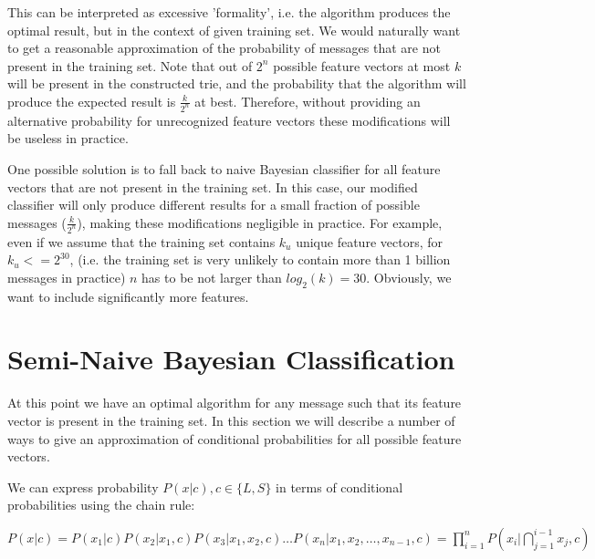 \documentclass[12pt]{report}
\makeatletter
\renewcommand{\subsection}{\@startsection{subsection}{2}{0mm}{-\baselineskip}{-5pt}{\bf}}
\makeatother
\begin{document}
This can be interpreted as excessive 'formality', i.e. the algorithm produces the optimal result, but in the context of given training set. We would naturally want to get a reasonable approximation of the probability of messages that are not present in the training set. Note that out of $2^n$ possible feature vectors at most $k$ will be present in the constructed trie, and the probability that the algorithm will produce the expected result is $\frac{k}{2^n}$ at best. Therefore, without providing an alternative probability for unrecognized feature vectors these modifications will be useless in practice.

One possible solution is to fall back to naive Bayesian classifier for all feature vectors that are not present in the training set. In this case, our modified classifier will only produce different results for a small fraction of possible messages ($\frac{k}{2^n}$), making these modifications negligible in practice. For example, even if we assume that the training set contains $k_u$ unique feature vectors, for $k_u <= 2^30$, (i.e. the training set is very unlikely to contain more than 1 billion messages in practice) $n$ has to be not larger than $log_2(k) = 30$. Obviously, we want to include significantly more features.

\newpage

\section{Semi-Naive Bayesian Classification}

At this point we have an optimal algorithm for any message such that its feature vector is present in the training set. In this section we will describe a number of ways to give an approximation of conditional probabilities for all possible feature vectors.

\subsection{Chain rule}

We can express probability $P(x | c), c \in \{L, S\}$ in terms of conditional probabilities using the chain rule:

\begin{center}
	$P(x | c) = P(x_1 | c) P(x_2 | x_1, c) P(x_3 | x_1, x_2, c) \dots P(x_n | x_1, x_2, \dots, x_{n - 1}, c) = \prod_{i=1}^{n}P(x_i | \bigcap_{j = 1}^{i - 1} x_j, c)$
\end{center}
\end{document}
